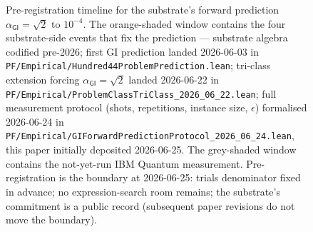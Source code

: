 \documentclass[11pt,a4paper]{amsart}
\theoremstyle{plain}
\theoremstyle{definition}
\begin{document}
\begin{figure}[h]
\caption{Pre-registration timeline for the substrate's forward prediction $\alpha_{\textsf{GI}} = \sqrt{2}$ to $10^{-4}$. The orange-shaded window contains the four substrate-side events that fix the prediction --- substrate algebra codified pre-2026; first GI prediction landed 2026-06-03 in \texttt{PF/Empirical/Hundred44ProblemPrediction.lean}; tri-class extension forcing $\alpha_{\textsf{GI}} = \sqrt{2}$ landed 2026-06-22 in \texttt{PF/Empirical/ProblemClassTriClass\_2026\_06\_22.lean}; full measurement protocol (shots, repetitions, instance size, $\epsilon$) formalised 2026-06-24 in \texttt{PF/Empirical/GIForwardPredictionProtocol\_2026\_06\_24.lean}, this paper initially deposited 2026-06-25. The grey-shaded window contains the not-yet-run IBM Quantum measurement. Pre-registration is the boundary at 2026-06-25: trials denominator fixed in advance; no expression-search room remains; the substrate's commitment is a public record (subsequent paper revisions do not move the boundary).}
\label{fig:timeline}
\end{figure}
\end{document}
